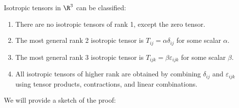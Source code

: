 \documentclass[a4paper]{article}
\begin{document}
Isotropic tensors in $\R^3$ can be classified:
\begin{thm}
  \begin{enumerate}
    \item There are no isotropic tensors of rank 1, except the zero tensor.
    \item The most general rank 2 isotropic tensor is $T_{ij} = \alpha \delta_{ij}$ for some scalar $\alpha$.
    \item The most general rank 3 isotropic tensor is $T_{ijk} = \beta \varepsilon_{ijk}$ for some scalar $\beta$.
    \item All isotropic tensors of higher rank are obtained by combining $\delta_{ij}$ and $\varepsilon_{ijk}$ using tensor products, contractions, and linear combinations.
  \end{enumerate}
\end{thm}
We will provide a sketch of the proof:
\end{document}
